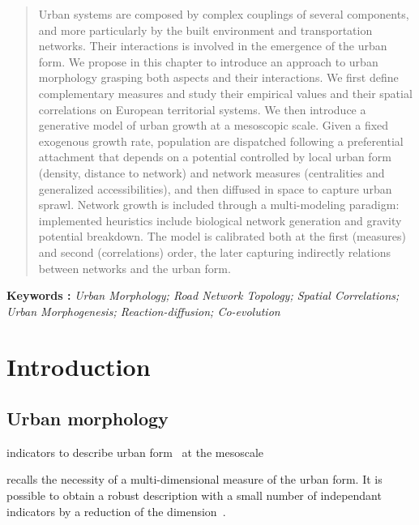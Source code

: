 \begin{abstract}
Urban systems are composed by complex couplings of several components, and more particularly by the built environment and transportation networks. Their interactions is involved in the emergence of the urban form. We propose in this chapter to introduce an approach to urban morphology grasping both aspects and their interactions. We first define complementary measures and study their empirical values and their spatial correlations on European territorial systems. We then introduce a generative model of urban growth at a mesoscopic scale. Given a fixed exogenous growth rate, population are dispatched following a preferential attachment that depends on a potential controlled by local urban form (density, distance to network) and network measures (centralities and generalized accessibilities), and then diffused in space to capture urban sprawl. Network growth is included through a multi-modeling paradigm: implemented heuristics include biological network generation and gravity potential breakdown. The model is calibrated both at the first (measures) and second (correlations) order, the later capturing indirectly relations between networks and the urban form.
\end{abstract}

\textbf{Keywords : }\textit{Urban Morphology; Road Network Topology; Spatial Correlations; Urban Morphogenesis; Reaction-diffusion; Co-evolution}



\section{Introduction}

\subsection{Urban morphology}



indicators to describe urban form~\cite{tsai2005quantifying} at the mesoscale

\cite{le2009quantifier} recalls the necessity of a multi-dimensional measure of the urban form. It is possible to obtain a robust description with a small number of independant indicators by a reduction of the dimension~\cite{Schwarz201029}.

